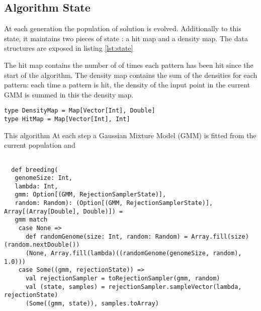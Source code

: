 \documentclass[10pt,a4paper]{article}
\theoremstyle{definition}
\theoremstyle{remark}
\begin{document}
\subsection{Algorithm State}

At each generation the population of solution is evolved. Additionally to this state, it maintains two pieces of state : a hit map and a density map. The data structures are exposed in listing \ref{lst:state}

The hit map contains the number of of times each pattern has been hit since the start of the algorithm. The density map contains the sum of the densities for each pattern: each time a pattern is hit, the density of the input point in the current GMM is summed in this the density map. 

\begin{lstlisting}[caption={State},label={lst:state}]
type DensityMap = Map[Vector[Int], Double]
type HitMap = Map[Vector[Int], Int]
\end{lstlisting}




 This algorithm At each step a Gaussian Mixture Model (GMM) is fitted from the current population and


\begin{lstlisting}[caption={Breeding function},label={lst:breeding}]

  def breeding(
   genomeSize: Int,
   lambda: Int,
   gmm: Option[(GMM, RejectionSamplerState)],
   random: Random): (Option[(GMM, RejectionSamplerState)], Array[(Array[Double], Double)]) =
   gmm match
    case None =>
      def randomGenome(size: Int, random: Random) = Array.fill(size)(random.nextDouble())
      (None, Array.fill(lambda)((randomGenome(genomeSize, random), 1.0)))
    case Some((gmm, rejectionState)) =>
      val rejectionSampler = toRejectionSampler(gmm, random)
      val (state, samples) = rejectionSampler.sampleVector(lambda, rejectionState)
      (Some((gmm, state)), samples.toArray)

\end{lstlisting}
\end{document}
